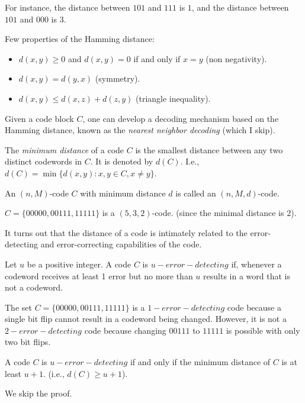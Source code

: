 For instance, the distance between $101$ and $111$ is $1$, 
and the distance between $101$ and $000$ is $3$.

Few properties of the Hamming distance:
\begin{itemize}
    \item $d(x,y)\ge0$ and $d(x,y)=0$ if and only if $x=y$ (non negativity).
    \item $d(x,y)=d(y,x)$ (symmetry).
    \item $d(x,y)\le d(x,z)+d(z,y)$ (triangle inequality).
\end{itemize}

Given a code block $C$, one can develop a decoding mechanism
based on the Hamming distance, known as the \emph{nearest neighbor decoding} (which I skip).


\begin{definition}
    The \emph{minimum distance} of a code $C$ is the smallest distance between any two distinct codewords in $C$.
    It is denoted by $d(C)$.
    I.e., $d(C) = \min\{d(x,y): x,y\in C, x\neq y\}$.
\end{definition}

\begin{definition}
    An $(n,M)$-code $C$ with minimum distance $d$ is called an $(n,M,d)$-code.
\end{definition}

\begin{example}
    $C=\{00000, 00111, 11111\}$ is a $(5,3,2)$-code. (since the minimal distance is $2$).
\end{example}


It turns out that the distance of a code is intimately related to the error-
detecting and error-correcting capabilities of the code.

\begin{definition}
Let $u$ be a positive integer. A code $C$ is $u-error-detecting$ 
if, whenever a codeword receives at least 1 error but no more than $u$ results
in a word that is not a codeword.
\end{definition}

\begin{example}
    The set $C=\{00000, 00111, 11111\}$ is a $1-error-detecting$ code because a single bit flip
    cannot result in a codeword being changed. 
    However, it is not a $2-error-detecting$ code because changing $00111$ to $11111$ is possible with 
    only two bit flips.
\end{example}

\begin{thm}
    A code $C$ is $u-error-detecting$ if and only if the minimum distance of $C$ is at least $u+1$.
    (i.e., $d(C)\ge u+1$).
\end{thm}
We skip the proof.


